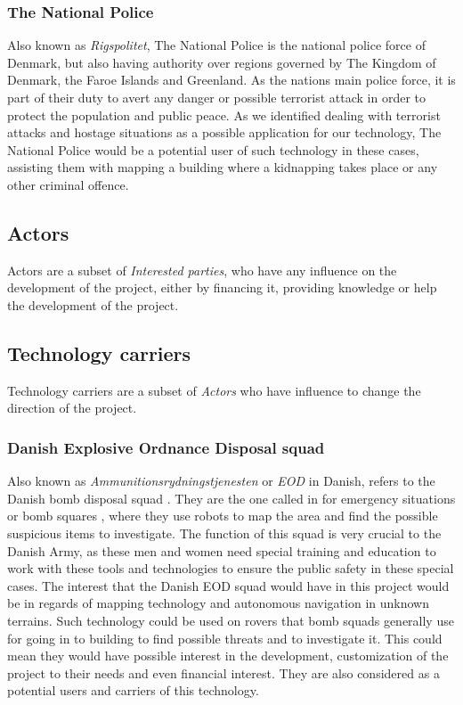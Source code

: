 \subsubsection{The National Police}
Also known as \textit{Rigspolitet}\cite{Police}, The National Police is the national police force of Denmark, but also having authority over regions governed by The Kingdom of Denmark, the Faroe Islands and Greenland. As the nations main police force, it is part of their duty to avert any danger or possible terrorist attack in order to protect the population and public peace. As we identified dealing with terrorist attacks and hostage situations as a possible application for our technology, The National Police would be a potential user of such technology in these cases, assisting them with mapping a building where a kidnapping takes place or any other criminal offence.

\subsection{Actors}
Actors are a subset of \textit{Interested parties}, who have any influence on the development of the project, either by financing it, providing knowledge or help the development of the project.
	
\subsection{Technology carriers}
Technology carriers are a subset of \textit{Actors} who have influence to change the direction of the project.

\subsubsection{Danish Explosive Ordnance Disposal squad} 
Also known as \textit{Ammunitionsrydningstjenesten} or \textit{EOD} in Danish, refers to the Danish bomb disposal squad \cite{EOD}. They are the one called in for emergency situations or bomb squares%
, where they use robots to map the area and find the possible suspicious items to investigate. The function of this squad is very crucial to the Danish Army, as these men and women need special training and education to work with these tools and technologies to ensure the public safety in these special cases. The interest that the Danish EOD squad would have in this project would be in regards of mapping technology and autonomous navigation in unknown terrains. Such technology could be used on rovers that bomb squads generally use for going in to building to find possible threats and to investigate it. This could mean they would have possible interest in the development, customization of the project to their needs and even financial interest. They are also considered as a potential users and carriers of this technology.


